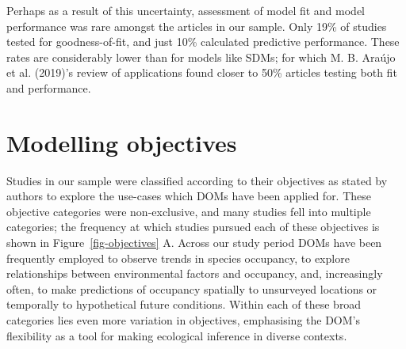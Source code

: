 \documentclass[
]{article}
\begin{document}
Perhaps as a result of this uncertainty, assessment of model fit and
model performance was rare amongst the articles in our sample. Only 19\%
of studies tested for goodness-of-fit, and just 10\% calculated
predictive performance. These rates are considerably lower than for
models like SDMs; for which M. B. Araújo et al. (2019)'s review of
applications found closer to 50\% articles testing both fit and
performance.

\section{Modelling objectives}\label{modelling-objectives}

Studies in our sample were classified according to their objectives as
stated by authors to explore the use-cases which DOMs have been applied
for. These objective categories were non-exclusive, and many studies
fell into multiple categories; the frequency at which studies pursued
each of these objectives is shown in Figure~\ref{fig-objectives} A.
Across our study period DOMs have been frequently employed to observe
trends in species occupancy, to explore relationships between
environmental factors and occupancy, and, increasingly often, to make
predictions of occupancy spatially to unsurveyed locations or temporally
to hypothetical future conditions. Within each of these broad categories
lies even more variation in objectives, emphasising the DOM's
flexibility as a tool for making ecological inference in diverse
contexts.
\end{document}
